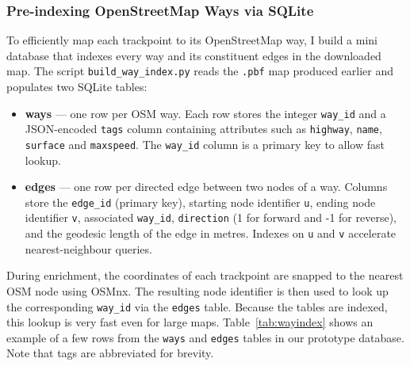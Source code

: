 \documentclass[11pt,a4paper]{report}
\begin{document}
\subsubsection{Pre-indexing OpenStreetMap Ways via SQLite}\label{sec:wayindex}
To efficiently map each trackpoint to its OpenStreetMap way, I build a mini database that indexes every way and its constituent edges in the downloaded map. The script \texttt{build\_way\_index.py} reads the \texttt{.pbf} map produced earlier and populates two SQLite tables:
\begin{itemize}
	\item \textbf{ways} --- one row per OSM way. Each row stores the integer \texttt{way\_id} and a JSON-encoded \texttt{tags} column containing attributes such as \texttt{highway}, \texttt{name}, \texttt{surface} and \texttt{maxspeed}. The \texttt{way\_id} column is a primary key to allow fast lookup.
	\item \textbf{edges} --- one row per directed edge between two nodes of a way. Columns store the \texttt{edge\_id} (primary key), starting node identifier \texttt{u}, ending node identifier \texttt{v}, associated \texttt{way\_id}, \texttt{direction} (1 for forward and -1 for reverse), and the geodesic length of the edge in metres. Indexes on \texttt{u} and \texttt{v} accelerate nearest-neighbour queries.
\end{itemize}
During enrichment, the coordinates of each trackpoint are snapped to the nearest OSM node using OSMnx. The resulting node identifier is then used to look up the corresponding \texttt{way\_id} via the \texttt{edges} table. Because the tables are indexed, this lookup is very fast even for large maps. Table~\ref{tab:wayindex} shows an example of a few rows from the \texttt{ways} and \texttt{edges} tables in our prototype database. Note that tags are abbreviated for brevity.
\end{document}
